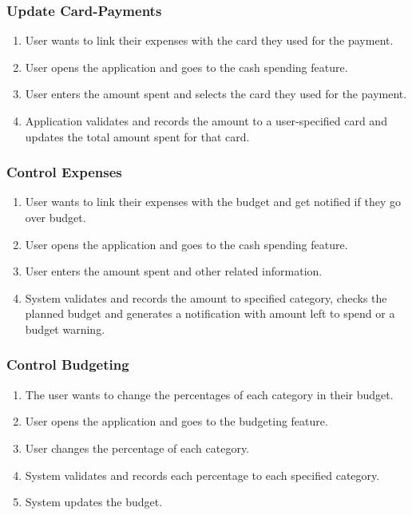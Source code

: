 \documentclass[12pt]{article}
\begin{document}
\subsubsection{Update Card-Payments}
\begin{enumerate}
  \item User wants to link their expenses with the card they used for the payment.
  \item User opens the application and goes to the cash spending feature. 
  \item User enters the amount spent and selects the card they used for the payment.
  \item Application validates and records the amount to a user-specified card and updates the total amount spent for that card.
\end{enumerate}

\subsubsection{Control Expenses}
\begin{enumerate}
  \item User wants to link their expenses with the budget and get notified if they go over budget.
  \item User opens the application and goes to the cash spending feature. 
  \item User enters the amount spent and other related information.
  \item System validates and records the amount to specified category, checks the planned budget and generates a notification with amount left to spend or a budget warning.
\end{enumerate}

\subsubsection{Control Budgeting}
\begin{enumerate}
  \item The user wants to change the percentages of each category in their budget. 
  \item User opens the application and goes to the budgeting feature. 
  \item User changes the percentage of each category.
  \item System validates and records each percentage to each specified category. 
  \item System updates the budget.
\end{enumerate}
\end{document}
